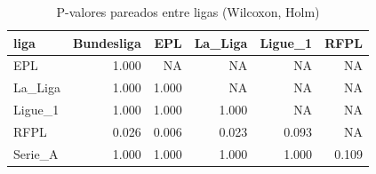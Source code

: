 \begin{table}

\caption{\label{tab:pareado_ligas_g10}P-valores pareados entre ligas (Wilcoxon, Holm)}
\centering
\begin{tabular}[t]{lrrrrr}
\toprule
liga & Bundesliga & EPL & La\_Liga & Ligue\_1 & RFPL\\
\midrule
EPL & 1.000 & NA & NA & NA & NA\\
La\_Liga & 1.000 & 1.000 & NA & NA & NA\\
Ligue\_1 & 1.000 & 1.000 & 1.000 & NA & NA\\
RFPL & 0.026 & 0.006 & 0.023 & 0.093 & NA\\
Serie\_A & 1.000 & 1.000 & 1.000 & 1.000 & 0.109\\
\bottomrule
\end{tabular}
\end{table}

